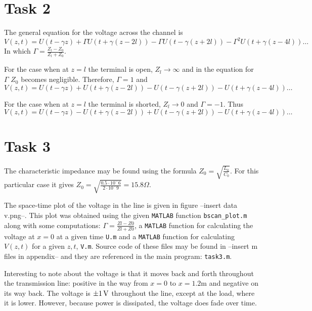 \documentclass[11pt,titlepage]{report}
\begin{document}
\section{Task 2}
The general equation for the voltage across the channel is 
\begin{equation}
V(z,t)=U(t-\gamma z) + \Gamma U(t+\gamma(z-2l))-\Gamma U(t-\gamma(z+2l))-\Gamma^2U(t+\gamma(z-4l))\dots
\end{equation}
In which $\Gamma=\frac{Z_l-Z_0}{Z_l+Z_0}$.

For the case when at $z=l$ the terminal is open, $Z_l \to \infty$ and in the equation for $\Gamma$ $Z_0$ becomes negligible. Therefore, $\Gamma=1$ and 
\begin{equation}
V(z,t)=U(t-\gamma z) + U(t+\gamma(z-2l))- U(t-\gamma(z+2l))- U(t+\gamma(z-4l))\dots
\end{equation}

For the case when at $z=l$ the terminal is shorted, $Z_l \to 0$ and $\Gamma=-1$. Thus 
\begin{equation}
V(z,t)=U(t-\gamma z) - U(t+\gamma(z-2l))+U(t-\gamma(z+2l))-U(t+\gamma(z-4l))\dots
\end{equation}


\section{Task 3}
The characteristic impedance may be found using the formula $Z_0=\sqrt{\frac{L_0}{C_0}}$. For this particular case it gives $Z_0=\sqrt{\frac{0.5\cdot10^-6}{2\cdot10^-9}}=15.8\Omega$. 

The space-time plot of the voltage in the line is given in figure --insert data v.png--. This plot was obtained using the given \texttt{MATLAB} function \texttt{bscan\_plot.m} along with some computations: $\Gamma=\frac{Zl-Z0}{Zl+Z0}$, a \texttt{MATLAB} function for calculating the voltage at $x=0$ at a given time \texttt{U.m} and a \texttt{MATLAB} function for calculating $V(z,t)$ for a given $z,t$, \texttt{V.m}. Source code of these files may be found in --insert m files in appendix-- and they are referenced in the main program: \texttt{task3.m}.

Interesting to note about the voltage is that it moves back and forth throughout the transmission line: positive in the way from $x=0$ to $x=1.2$m and negative on its way back. The voltage is $\SI{\pm1}{V}$ throughout the line, except at the load, where it is lower. However, because power is dissipated, the voltage does fade over time.
\end{document}
